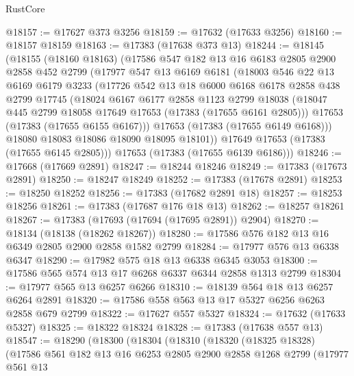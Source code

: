 \begin{lexlean}{RustCore}
\begin{coremodule}
@18157 := @17627 @373 @3256
@18159 := @17632 (@17633 @3256)
@18160 := @18157 @18159
@18163 := @17383 (@17638 @373 @13)
@18244 := @18145
    (@18155
      (@18160 @18163)
      (@17586
        @547
        @182
        @13
        @16
        @6183
        @2805
        @2900
        @2858
        @452
        @2799
        (@17977
          @547
          @13
          @6169
          @6181
          (@18003
            @546
            @22
            @13
            @6169
            @6179
            @3233
            (@17726
              @542
              @13
              @18
              @6000
              @6168
              @6178
              @2858
              @438
              @2799
              @17745
              (@18024
                @6167
                @6177
                @2858
                @1123
                @2799
                @18038
                (@18047 @445 @2799 @18058 @17649 @17653 (@17383 (@17655 @6161 @2805)))
                @17653
                (@17383 (@17655 @6155 @6167)))
              @17653
              (@17383 (@17655 @6149 @6168)))
            @18080
            @18083
            @18086
            @18090
            @18095
            @18101))
        @17649
        @17653
        (@17383 (@17655 @6145 @2805)))
      @17653
      (@17383 (@17655 @6139 @6186)))
@18246 := @17668 (@17669 @2891)
@18247 := @18244 @18246
@18249 := @17383 (@17673 @2891)
@18250 := @18247 @18249
@18252 := @17383 (@17678 @2891)
@18253 := @18250 @18252
@18256 := @17383 (@17682 @2891 @18)
@18257 := @18253 @18256
@18261 := @17383 (@17687 @176 @18 @13)
@18262 := @18257 @18261
@18267 := @17383 (@17693 (@17694 (@17695 @2891)) @2904)
@18270 := @18134 (@18138 (@18262 @18267))
@18280 := @17586 @576 @182 @13 @16 @6349 @2805 @2900 @2858 @1582 @2799
@18284 := @17977 @576 @13 @6338 @6347
@18290 := @17982 @575 @18 @13 @6338 @6345 @3053
@18300 := @17586 @565 @574 @13 @17 @6268 @6337 @6344 @2858 @1313 @2799
@18304 := @17977 @565 @13 @6257 @6266
@18310 := @18139 @564 @18 @13 @6257 @6264 @2891
@18320 := @17586 @558 @563 @13 @17 @5327 @6256 @6263 @2858 @679 @2799
@18322 := @17627 @557 @5327
@18324 := @17632 (@17633 @5327)
@18325 := @18322 @18324
@18328 := @17383 (@17638 @557 @13)
@18547 := @18290
    (@18300
      (@18304
        (@18310
          (@18320
            (@18325 @18328)
            (@17586
              @561
              @182
              @13
              @16
              @6253
              @2805
              @2900
              @2858
              @1268
              @2799
              (@17977
                @561
                @13

\end{coremodule}
\end{lexlean}
